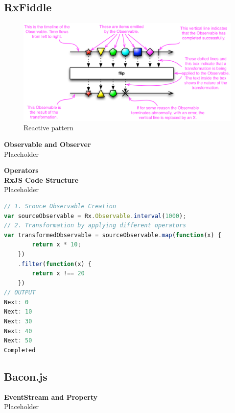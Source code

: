 	\subsection{RxFiddle}





\begin{figure}[!h]
	\centering
	\includegraphics[scale=0.5,trim=0 0 0 0]{gfx/rxjs-reactive-pattern2.png}
	\caption{Reactive pattern \protect\cite{ReactiveXobservable}}
	\label{fig:rxjs-reactive-pattern}
\end{figure}

\textbf{Observable and Observer}\\
Placeholder

\textbf{Operators}
\label{subsec:Operators}\\

\textbf{RxJS Code Structure}\\
Placeholder
\begin{lstlisting}[language=JavaScript, caption=RxJS Simple Example, label={lst:RxJS_Simple_Example}]
// 1. Srouce Observable Creation
var sourceObservable = Rx.Observable.interval(1000);
// 2. Transformation by applying different operators
var transformedObservable = sourceObservable.map(function(x) {
		return x * 10;
	})
	.filter(function(x) {
		return x !== 20
	})
// OUTPUT
Next: 0
Next: 10
Next: 30
Next: 40
Next: 50
Completed
\end{lstlisting}

\subsection{Bacon.js}

\textbf{EventStream and Property}\\
Placeholder

